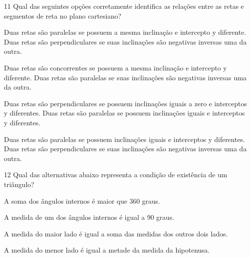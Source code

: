 \num{11} Qual das seguintes opções corretamente identifica as relações entre
as retas e segmentos de reta no plano cartesiano?
\item Duas retas são paralelas se possuem a mesma inclinação e intercepto y
diferente. Duas retas são perpendiculares se suas inclinações são
negativas inversas uma da outra.
\item Duas retas são concorrentes se possuem a mesma inclinação e
intercepto y diferente. Duas retas são paralelas se suas inclinações são
negativas inversas uma da outra.
\item Duas retas são perpendiculares se possuem inclinações iguais a zero e
interceptos y diferentes. Duas retas são paralelas se possuem
inclinações iguais e interceptos y diferentes.
\item Duas retas são paralelas se possuem inclinações iguais e interceptos
y diferentes. Duas retas são perpendiculares se suas inclinações são
negativas inversas uma da outra.







\num{12} Qual das alternativas abaixo representa a condição de existência de
um triângulo?
\item A soma dos ângulos internos é maior que 360 graus.
\item A medida de um dos ângulos internos é igual a 90 graus.
\item A medida do maior lado é igual a soma das medidas dos outros dois
lados.
\item A medida do menor lado é igual a metade da medida da hipotenusa.


